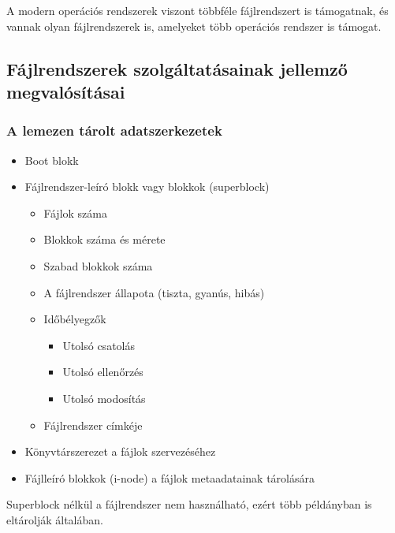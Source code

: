 \documentclass[tikz,12pt,margin=0px]{article}
\begin{document}
    \noindent A modern operációs rendszerek viszont többféle fájlrendszert is támogatnak, és vannak olyan fájlrendszerek is, amelyeket több operációs rendszer is támogat.
\newpage
	\subsection*{Fájlrendszerek szolgáltatásainak jellemző megvalósításai\\}
	
    \subsubsection*{A lemezen tárolt adatszerkezetek}

    \begin{itemize}[topsep=8pt,itemsep=4pt,partopsep=4pt, parsep=4pt]
        \item Boot blokk
        \item Fájlrendszer-leíró blokk vagy blokkok (superblock)
        \begin{itemize}[topsep=8pt,itemsep=4pt,partopsep=4pt, parsep=4pt]
            \item Fájlok száma
            \item Blokkok száma és mérete
            \item Szabad blokkok száma
            \item A fájlrendszer állapota (tiszta, gyanús, hibás)
            \item Időbélyegzők
            \begin{itemize}
                \item Utolsó csatolás
                \item Utolsó ellenőrzés
                \item Utolsó modosítás
            \end{itemize}
            \item Fájlrendszer címkéje
        \end{itemize}
        \item Könyvtárszerezet a fájlok szervezéséhez
        \item Fájlleíró blokkok (i-node) a fájlok metaadatainak tárolására
    \end{itemize}

    \noindent Superblock nélkül a fájlrendszer nem használható, ezért több példányban is eltárolják általában.
\end{document}
